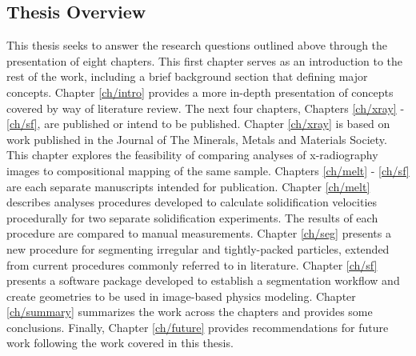 \subsection{Thesis Overview}
This thesis seeks to answer the research questions outlined above through
the presentation of eight chapters. This first chapter serves as an
introduction to the rest of the work, including a brief background section
that defining major concepts.
Chapter \ref{ch/intro} provides a more in-depth presentation of concepts
covered by way of literature review.
The next four chapters,
Chapters \ref{ch/xray} - \ref{ch/sf}, are published or intend to be
published. Chapter \ref{ch/xray} is based on work published in the
Journal of The Minerals, Metals and Materials Society. This chapter
explores the feasibility of comparing analyses of x-radiography
images to compositional mapping of the same sample.
Chapters \ref{ch/melt} - \ref{ch/sf} are each separate manuscripts
intended for publication. Chapter \ref{ch/melt} describes analyses
procedures developed to calculate solidification velocities procedurally
for two separate solidification experiments. The results of each procedure
are compared to manual measurements.
Chapter \ref{ch/seg} presents a new procedure for segmenting irregular and
tightly-packed particles, extended from current procedures commonly
referred to in literature.
Chapter \ref{ch/sf} presents a software package developed to establish
a segmentation workflow and create geometries to be used in image-based
physics modeling.
Chapter \ref{ch/summary} summarizes the work across the chapters and
provides some conclusions.
Finally, Chapter \ref{ch/future} provides recommendations for future
work following the work covered in this thesis.

